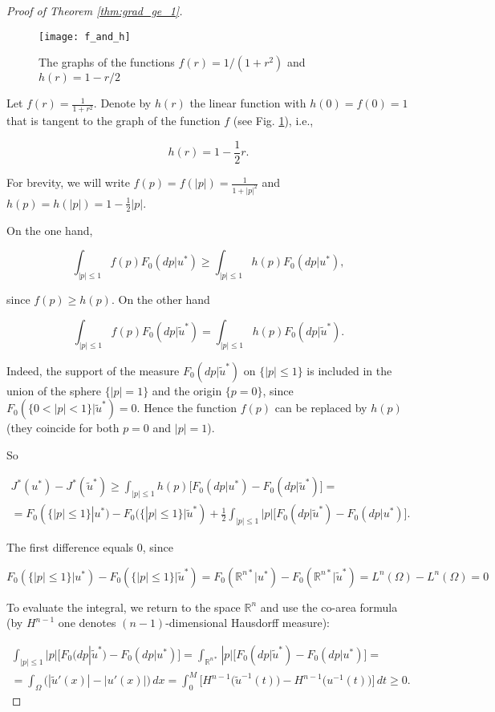 \documentclass[14pt]{extarticle}
\renewcommand{\le}{\leqslant}
\renewcommand{\ge}{\geqslant}
\newcommand{\R}{\mathbb{R}}
\theoremstyle{remark}
\theoremstyle{definition}
\begin{document}
\begin{proof}[Proof of Theorem \ref{thm:grad_ge_1}]
	\begin{figure}
	\begin{center}
		\texttt{[image: f\_and\_h]}
	\end{center}
	\caption{The graphs of the functions $f(r)=1/(1+r^2)$ and $h(r)=1-r/2$}
	\label{fig:f_and_h}
	\end{figure}

	Let $f(r) = \frac{1}{1+r^2}$. Denote by $h(r)$  the linear function with $h(0)=f(0)=1$ that is tangent to the graph of the function $f$ (see Fig. \ref{fig:f_and_h}), i.e.,

	\[
		h(r) = 1-\frac12r.
	\]
	
	\noindent For brevity, we will write $f(p)=f(|p|)=\frac{1}{1+|p|^2}$ and $h(p)=h(|p|)=1-\frac12|p|$.
	
	On the one hand,
	
	\[
		\int_{|p|\le 1} f(p)F_0(dp|u^*) \ge \int_{|p|\le 1}h(p)F_0(dp|u^*),
	\]

	\noindent since $f(p)\ge h(p)$. On the other hand
	
	\[
		\int_{|p|\le 1} f(p)F_0(dp|\tilde u^*) = \int_{|p|\le 1} h(p)F_0(dp|\tilde u^*).
	\]

	\noindent Indeed, the support of the measure $F_0(dp|\tilde u^*)$ on $\{|p|\le 1\}$ is included in the union of the sphere  $\{|p|=1\}$ and the origin $\{p=0\}$, since $F_0(\{0<|p|<1\}|\tilde u^*)=0$. Hence the function $f(p)$ can be replaced by $h(p)$ (they coincide for both $p=0$ and $|p|=1$).	
	
	So
	
	\begin{multline*}
		J^*(u^*) - J^*(\tilde u^*)\ge \int_{|p|\le 1} h(p)\big[F_0(dp|u^*)-F_0(dp|\tilde u^*)\big]=\\
		=F_0(\{|p|\le 1\}|u^*)-F_0(\{|p|\le 1\}|\tilde u^*) + \frac12\int_{|p|\le 1}|p|\big[F_0(dp|\tilde u^*)- F_0(dp|u^*)\big].
	\end{multline*}

	The first difference equals 0, since
	
	\[
		F_0(\{|p|\le 1\}|u^*)-F_0(\{|p|\le 1\}|\tilde u^*) = F_0(\R^{n*}|u^*) - F_0(\R^{n*}|\tilde u^*) 
		=L^n(\Omega)-L^n(\Omega)=0
	\]

	To evaluate the integral, we return to the space $\R^n$ and use the co-area formula (by $H^{n-1}$ one denotes $(n-1)$-dimensional Hausdorff measure):
	
	\begin{multline*}
		\int_{|p|\le 1}|p|\big[F_0(dp|\tilde u^*)- F_0(dp\big|u^*)\big] = 
		\int_{\R^{n*}}|p|\big[F_0(dp|\tilde u^*)- F_0(dp|u^*)\big] = \\
		=\int_\Omega \big(|\tilde u'(x)| - |u'(x)|\big)\,dx = 
		\int_0^M \Big[H^{n-1}\big(\tilde u^{-1}(t)\big) - H^{n-1}\big(u^{-1}(t)\big) \Big]\,dt\ge 0.
	\end{multline*}


\end{proof}
\end{document}
